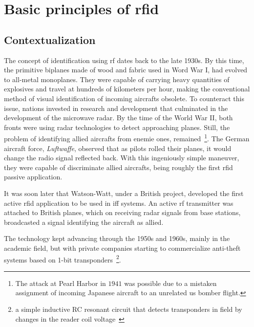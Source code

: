 \chapter{Basic principles of \acs{rfid}}

\section{Contextualization} \label{sec:contextualization}

The concept of identification using \ac{rf} dates back to the late 1930s.
By this time, the primitive biplanes made of wood and fabric used in Word War I, had evolved to all-metal monoplanes. They were capable of carrying heavy quantities of explosives and travel at hundreds of kilometers per hour, making the conventional method of visual identification of incoming aircrafts obsolete.
To counteract this issue, nations invested in research and development that culminated in the development of the microwave radar.
By the time of the World War II, both fronts were using radar technologies to detect approaching planes. 
Still, the problem of identifying allied aircrafts from enemie ones, remained~\footnote{The attack at Pearl Harbor in $1941$ was possible due to a mistaken assignment of incoming Japanese aircraft to an unrelated \ac{us} bomber flight.}.
The German aircraft force, \emph{Luftwaffe}, observed that as pilots rolled their planes, it would change the radio signal reflected back. With this ingeniously simple maneuver, they were capable of discriminate allied aircrafts, being roughly the first \ac{rfid} passive application.~\cite{dobkinRFRFIDSecond2012}

It was soon later that Watson-Watt, under a British project, developed the first active \ac{rfid} application to be used in \ac{iff} systems. An active \ac{rf} transmitter was attached to British planes, which on receiving radar signals from base stations, broadcasted a signal identifying the aircraft as allied.~\cite{HistoryRFIDTechnology}


The technology kept advancing through the 1950s and 1960s, mainly in the academic field, but with private companies starting to commercialize anti-theft systems based on 1-bit transponders~\footnote{a simple inductive RC resonant circuit that detects transponders in field by changes in the reader coil voltage~\cite{andreventuradacruzmarnotozuqueteIdentificacaoPorRFID2018}}.

